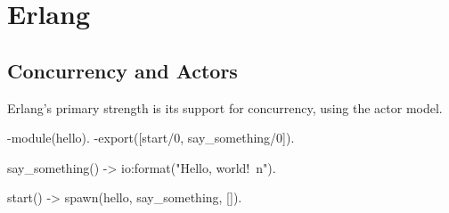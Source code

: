 
\section{Erlang}

\lipsum[5] %

\subsection{Concurrency and Actors}
Erlang's primary strength is its support for concurrency, using the actor model.
\begin{erlangcode}
-module(hello).
-export([start/0, say_something/0]).

say_something() ->
    io:format("Hello, world!~n").

start() ->
    spawn(hello, say_something, []).
\end{erlangcode}

\lipsum[6]